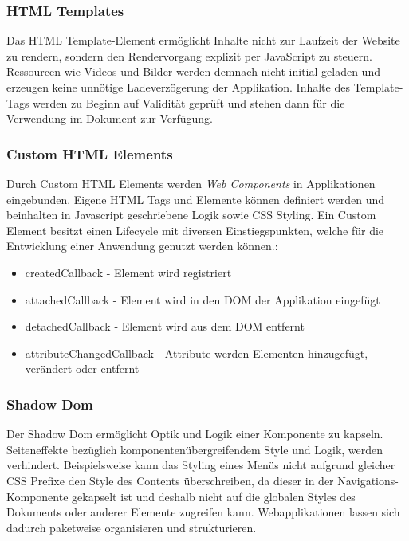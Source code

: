 \vspace{0.3cm}

\vspace{0.3cm}

\subsubsection{HTML Templates}

Das HTML Template-Element ermöglicht Inhalte nicht zur Laufzeit der Website zu rendern,
sondern den Rendervorgang explizit per JavaScript zu steuern. Ressourcen wie Videos und Bilder werden demnach
nicht initial geladen und erzeugen keine unnötige Ladeverzögerung der Applikation.
Inhalte des Template-Tags werden zu Beginn auf Validität geprüft und stehen dann für die Verwendung im Dokument
zur Verfügung.

\subsubsection{Custom HTML Elements}

Durch Custom HTML Elements werden \emph{Web Components} in Applikationen eingebunden.
Eigene HTML Tags und Elemente können definiert werden und beinhalten in Javascript geschriebene Logik sowie CSS Styling.
Ein Custom Element besitzt einen Lifecycle mit diversen Einstiegspunkten, welche für die Entwicklung einer Anwendung genutzt werden können.:

\begin{itemize}
\item createdCallback - Element wird registriert
\item attachedCallback - Element wird in den DOM der Applikation eingefügt
\item detachedCallback - Element wird aus dem DOM entfernt
\item attributeChangedCallback - Attribute werden Elementen hinzugefügt, verändert oder entfernt
\end{itemize}


\subsubsection{Shadow Dom}
Der Shadow Dom ermöglicht Optik und Logik einer Komponente zu kapseln.
Seiteneffekte bezüglich komponentenübergreifendem Style und Logik, werden verhindert.
Beispielsweise kann das Styling eines Menüs nicht aufgrund gleicher CSS Prefixe den Style des Contents überschreiben,
da dieser in der Navigations-Komponente gekapselt ist und deshalb nicht auf die globalen Styles des Dokuments oder anderer Elemente zugreifen kann.
Webapplikationen lassen sich dadurch paketweise organisieren und strukturieren.
